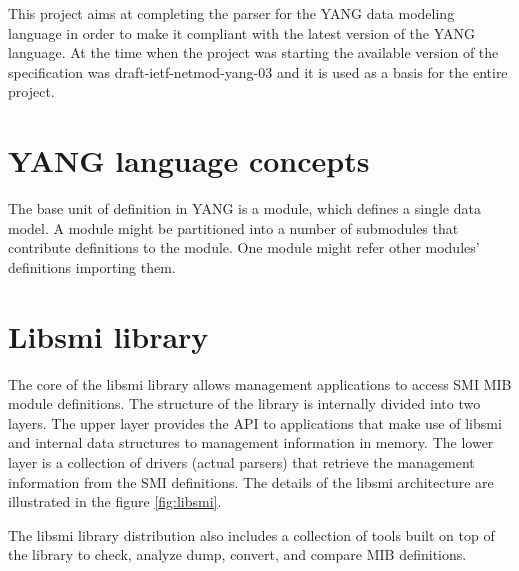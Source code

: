 \documentclass[conference]{IEEEtran}
\begin{document}
This project aims at completing the parser for the YANG data modeling language in order to make it compliant with the latest version of the YANG language. At the time when the project was starting the available version of the specification was draft-ietf-netmod-yang-03 \cite{bib3} and it is used as a basis for the entire project.

\section{YANG language concepts}
The base unit of definition in YANG is a module, which defines a single data model. A module might be partitioned into a number of submodules that contribute definitions to the module. One module might refer other modules' definitions importing them. 

\section{Libsmi library}
The core of the libsmi library allows management applications to access SMI MIB module definitions. 
The structure of the library \cite{bib7} is internally divided into two layers. 
The upper layer provides the API to applications that make use of libsmi and internal data structures to management information in memory. 
The lower layer is a collection of drivers (actual parsers) that retrieve the management information from the SMI definitions.
The details of the libsmi architecture are illustrated in the figure \ref{fig:libsmi}.  

The libsmi library distribution also includes a collection of tools built on top of the library to check, analyze dump, convert, and compare MIB definitions.
\end{document}
